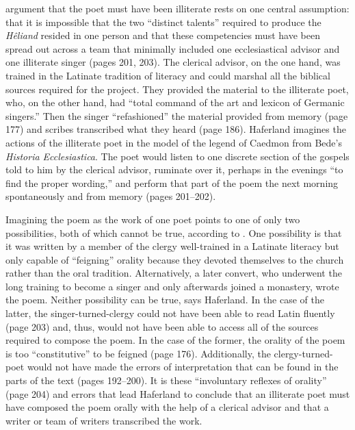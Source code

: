  argument that the poet must have been illiterate rests on one central assumption: that it is impossible that the two “distinct talents” required to produce the \textit{Hêliand} resided in one person and that these competencies must have been spread out across a team that minimally included one ecclesiastical advisor and one illiterate singer (pages 201, 203). The clerical advisor, on the one hand, was trained in the Latinate tradition of literacy and could marshal all the biblical sources required for the project. They provided the material to the illiterate poet, who, on the other hand, had “total command of the art and lexicon of Germanic singers.” Then the singer “refashioned” the material provided from memory (page 177) and scribes transcribed what they heard (page 186). Haferland imagines the actions of the illiterate poet in the model of the legend of Caedmon from Bede’s \textit{Historia Ecclesiastica}. The poet would listen to one discrete section of the gospels told to him by the clerical advisor, ruminate over it, perhaps in the evenings “to find the proper wording,” and perform that part of the poem the next morning spontaneously and from memory (pages 201--202).

Imagining the poem as the work of one poet points to one of only two possibilities, both of which cannot be true, according to \citet{Haferland2010}. One possibility is that it was written by a member of the clergy well-trained in a Latinate literacy but only capable of “feigning” orality because they devoted themselves to the church rather than the oral tradition. Alternatively, a later convert, who underwent the long training to become a singer and only afterwards joined a monastery, wrote the poem. Neither possibility can be true, says Haferland. In the case of the latter, the singer-turned-clergy could not have been able to read Latin fluently (page 203) and, thus, would not have been able to access all of the sources required to compose the poem. In the case of the former, the orality of the poem is too “constitutive” to be feigned (page 176). Additionally, the clergy-turned-poet would not have made the errors of interpretation that can be found in the parts of the text (pages 192--200). It is these “involuntary reflexes of orality” (page 204) and errors that lead Haferland to conclude that an illiterate poet must have composed the poem orally with the help of a clerical advisor and that a writer or team of writers transcribed the work.


